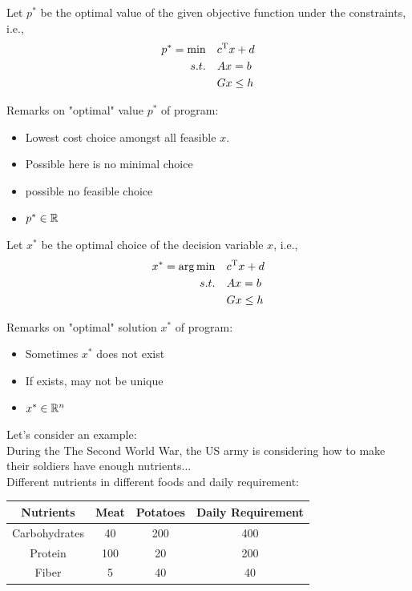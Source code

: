 \vspace{0.5cm}
Let $p^*$ be the optimal value of the given objective function under the constraints, i.e.,
\begin{align*}
	p^* = \min \quad &c^{{\rm T}}x + d\\
	s.t.\quad &Ax = b\\
	&Gx\leq h
\end{align*}

Remarks on "optimal" value $p^*$ of program:
\begin{itemize}
	\item Lowest cost choice amongst all feasible $x$.
	
	\item Possible here is no minimal choice
	
	\item possible no feasible choice
	
	\item $p^*\in \mathbb{R}$
\end{itemize}

\vspace{0.5cm}
Let $x^*$ be the optimal choice of the decision variable $x$, i.e.,
\begin{align*}
	x^* = \arg \min \quad&c^{{\rm T}}x + d\\
	s.t.\quad &Ax = b\\
	&Gx\leq h
\end{align*}

Remarks on "optimal" solution $x^*$ of program:
\begin{itemize}
	\item Sometimes $x^*$ does not exist
	
	\item If exists, may not be unique
	
	\item $x^*\in \mathbb{R}^n$
\end{itemize}




\vspace{0.5cm}
Let's consider an example:\\

During the The Second World War, the US army is considering how to make their soldiers have enough nutrients...\\

Different nutrients in different foods and daily requirement:
\begin{center}
	\begin{tabular}{|c|c|c|c|}
		\hline 
		Nutrients&Meat&Potatoes&Daily Requirement\\
		\hline  
		Carbohydrates&40&200&400\\
		\hline  
		Protein&100&20&200\\
		\hline  
		Fiber&5&40&40\\
		\hline 
	\end{tabular}
\end{center}



